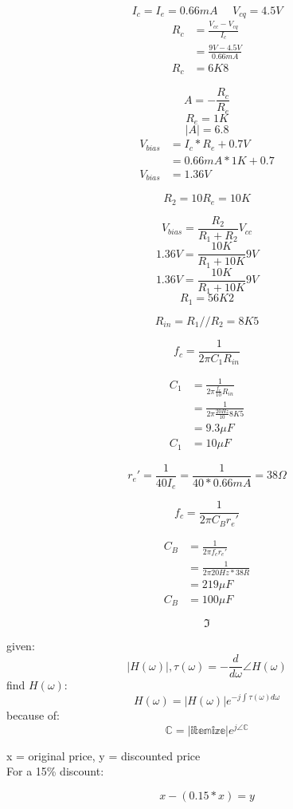 \documentclass[20pt]{article}
\begin{document}
$$I_{c} = I_{e} = 0.66mA \> \> \>  \> \> \> V_{cq} = 4.5V$$
\begin{align*}
	R_{c} &= \frac{V_{cc} - V_{cq}}{I_{c}} \\
	      &= \frac{9V - 4.5V}{0.66mA} \\
	R_{c} &= 6K8
\end{align*}

$$A = -\frac{R_{c}}{R_{e}}$$
$$R_{e} = 1K$$
$$|A| = 6.8$$
\begin{align*}
	V_{bias} &= I_{c} * R_{e} + 0.7V \\
	         &= 0.66mA * 1K + 0.7 \\
	V_{bias} &= 1.36V
\end{align*}

$$R_{2} = 10R_{e} = 10K$$

$$V_{bias} = \frac{R_{2}}{R_{1} + R_{2}}V_{cc}$$
$$1.36V = \frac{10K}{R_{1} + 10K}9V$$
$$1.36V = \frac{10K}{R_{1} + 10K}9V$$
$$R_{1} = 56K2$$

$$R_{in} = R_{1}//R_{2} = 8K5$$

$$f_{c} = \frac{1}{2\pi C_{1}R_{in}}$$

\begin{align*}
	C_{1} &= \frac{1}{2\pi \frac{f_{c}}{10}R_{in}} \\
	      &= \frac{1}{2\pi \frac{20Hz}{10}8K5} \\
	      &= 9.3\mu F \\
	      C_{1} &= 10\mu F
\end{align*}

$$r_{e}' = \frac{1}{40I_{e}} = \frac{1}{40*0.66mA} = 38\Omega$$

$$f_{c} = \frac{1}{2\pi C_{B}r_{e}'}$$

\begin{align*}
	C_{B} &= \frac{1}{2\pi f_{c}r_{e}'} \\
	      &= \frac{1}{2\pi 20Hz*38R} \\
	      &= 219\mu F \\
	      C_{B} &= 100\mu F
\end{align*}

$$\Im$$
\begin{center}
given:
$$|H(\omega)|, \tau (\omega) = -\frac{d}{d\omega}\angle H(\omega)$$
find $H(\omega)$:
$$H(\omega) = |H(\omega)|e^{-j\int_{}^{} \tau (\omega)d\omega}$$
because of:
$$\mathbb{C} = |\mathbb{itemize}|e^{j\angle \mathbb{C}}$$
\end{center}
\newpage

\begin{center}
x = original price, y = discounted price \\
For a 15\% discount:
\end{center}
$$x - (0.15*x) = y$$
\end{document}
